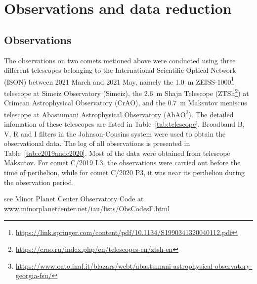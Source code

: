 \section{Observations and data reduction} \label{sec:obs_data}

\subsection{Observations}

The observations on two comets metioned above were conducted using three different telescopes belonging to the International Scientific Optical Network (ISON) between 2021 March and 2021 May, namely the {\qty{1.0}{\m}} ZEISS-1000\footnote{\url{https://link.springer.com/content/pdf/10.1134/S1990341320040112.pdf}} 
telescope at Simeiz Observatory (Simeiz), the {\qty{2.6}{\m}} Shajn Telescope (ZTSh\footnote{\url{https://crao.ru/index.php/en/telescopes-en/ztsh-en}}) 
at Crimean Astrophysical Observatory (CrAO), and the {\qty{0.7}{\m}} Maksutov meniscus telescope at Abastumani Astrophysical Observatory (AbAO\footnote{\url{https://www.oato.inaf.it/blazars/webt/abastumani-astrophysical-observatory-georgia-fsu/}}). 
The detailed infomation of these telescopes are listed in Table~\ref{tab:telescope}. Broadband B, V, R and I filters in the Johnson-Cousins system were used to obtain the observational data. The log of all observations is presented in Table~\ref{tab:c2019andc2020}. Most of the data were obtained from telescope Maksutov. For comet C/2019 L3, the observations were carried out before the time of perihelion, while for comet C/2020 P3, it was near its perihelion during the observation period. 

\begin{table}
    \centering
    \caption{Information of instrunments used. }\label{tab:telescope}
    \begin{threeparttable}
        \begin{tablenotes}
            \item[1] see Minor Planet Center Observatory Code at \\
            \url{www.minorplanetcenter.net/iau/lists/ObsCodesF.html}
        \end{tablenotes}
    \end{threeparttable}
\end{table}

